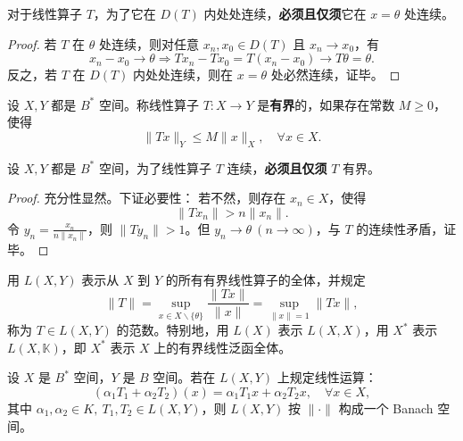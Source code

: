 \documentclass[lang=cn,newtx,10pt,scheme=chinese,thmcnt=chapter]{elegantbook}
\begin{document}
	\begin{proposition}
		对于线性算子 $T$，为了它在 $D(T)$ 内处处连续，\textbf{必须且仅须}它在 $x = \theta$ 处连续。  
	\end{proposition}
	
	\begin{proof}
		若 $T$ 在 $\theta$ 处连续，则对任意 $x_n, x_0 \in D(T)$ 且 $x_n \to x_0$，有  
		\[
		x_n - x_0 \to \theta \Longrightarrow T x_n - T x_0 = T(x_n - x_0) \to T \theta = \theta.
		\]
		反之，若 $T$ 在 $D(T)$ 内处处连续，则在 $x = \theta$ 处必然连续，证毕。
	\end{proof}
	
	\begin{definition}
		设 ${X}, {Y}$ 都是 $B^*$ 空间。称线性算子 $T: {X} \to {Y}$ 是\textbf{有界}的，如果存在常数 $M \geq 0$，使得  
		\[
		\|T x\|_{{Y}} \leq M \|x\|_{{X}}, \quad \forall x \in {X}.
		\]
	\end{definition}
	
	\begin{proposition}
		设 ${X}, {Y}$ 都是 $B^*$ 空间，为了线性算子 $T$ 连续，\textbf{必须且仅须} $T$ 有界。
	\end{proposition}
	
	\begin{proof}
		充分性显然。下证必要性：  
		若不然，则存在 $x_n \in {X}$，使得  
		\[
		\|T x_n\| > n \|x_n\|.
		\]
		令 $y_n = \frac{x_n}{n \|x_n\|}$，则 $\|T y_n\| > 1$。但 $y_n \to \theta \ (n \to \infty)$，与 $T$ 的连续性矛盾，证毕。
	\end{proof}
	
	\begin{definition}
		用 ${L}({X}, {Y})$ 表示从 ${X}$ 到 ${Y}$ 的所有有界线性算子的全体，并规定  
		\[
		\|T\| = \sup_{x \in {X} \backslash \{\theta\}} \frac{\|T x\|}{\|x\|} = \sup_{\|x\| = 1} \|T x\|,
		\]
		称为 $T \in {L}({X}, {Y})$ 的范数。特别地，用 ${L}({X})$ 表示 ${L}({X}, {X})$，用 ${X}^*$ 表示 $L({X}, \mathbb{K})$，即 ${X}^*$ 表示 ${X}$ 上的有界线性泛函全体。
	\end{definition}
	
	\begin{proposition}
		设 ${X}$ 是 $B^*$ 空间，${Y}$ 是 $B$ 空间。若在 ${L}({X}, {Y})$ 上规定线性运算：
		\[
		\left(\alpha_1 T_1 + \alpha_2 T_2\right)(x) = \alpha_1 T_1 x + \alpha_2 T_2 x, \quad \forall x \in {X},
		\]
		其中 $\alpha_1, \alpha_2 \in K, \ T_1, T_2 \in {L}({X}, {Y})$，则 ${L}({X}, {Y})$ 按 $\|\cdot\|$ 构成一个 Banach 空间。
	\end{proposition}
	
\end{document}

